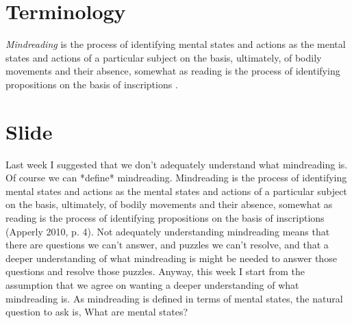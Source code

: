 \documentclass[12pt,\papersize]{extarticle}
\begin{document}
\setlength\footnotesep{1em}




\maketitle
%
%
%



\section{Terminology}


\textit{Mindreading} is 
	the process of 
	identifying mental states and actions 
	as the mental states and actions of a particular subject 
	on the basis, ultimately, of bodily movements and their absence,
somewhat as reading is the process of identifying propositions on the basis of inscriptions \citep[p.\ 4]{Apperly:2010kx}.


\section{Slide}
Last week I suggested that we don’t adequately understand what mindreading is.
Of course we can *define* mindreading.
Mindreading is the process of identifying mental states and actions as the mental states and actions of a particular subject on the basis, ultimately, of bodily movements and their absence, somewhat as reading is the process of identifying propositions on the basis of inscriptions (Apperly 2010, p. 4).
Not adequately understanding mindreading means that there are questions we can’t answer, and puzzles we can’t resolve, and that a deeper understanding of what mindreading is might be needed to answer those questions and resolve those puzzles.
Anyway, this week I start from the assumption that we agree on wanting a deeper understanding of what mindreading is.
As mindreading is defined in terms of mental states, the natural question to ask is,
What are mental states?
\end{document}
